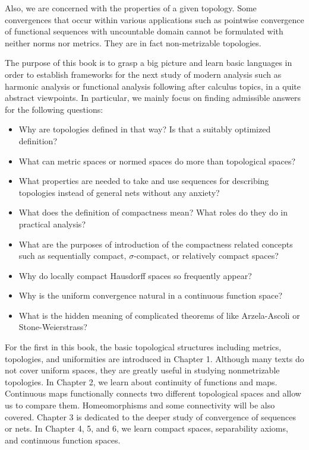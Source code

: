 Also, we are concerned with the properties of a given topology.
Some convergences that occur within various applications such as pointwise convergence of functional sequences with uncountable domain cannot be formulated with neither norms nor metrics.
They are in fact non-metrizable topologies.
\fi




The purpose of this book is to grasp a big picture and learn basic languages in order to establish frameworks for the next study of modern analysis such as harmonic analysis or functional analysis following after calculus topics, in a quite abstract viewpoints.
In particular, we mainly focus on finding admissible answers for the following questions:
\begin{itemize}
\item Why are topologies defined in that way? Is that a suitably optimized definition?
\item What can metric spaces or normed spaces do more than topological spaces?
\item What properties are needed to take and use sequences for describing topologies instead of general nets without any anxiety? 
\item What does the definition of compactness mean? What roles do they do in practical analysis?
\item What are the purposes of introduction of the compactness related concepts such as sequentially compact, $\sigma$-compact, or relatively compact spaces?
\item Why do locally compact Hausdorff spaces so frequently appear?
\item Why is the uniform convergence natural in a continuous function space?
\item What is the hidden meaning of complicated theorems of like Arzela-Ascoli or Stone-Weierstrass?
\end{itemize}
For the first in this book, the basic topological structures including metrics, topologies, and uniformities are introduced in Chapter 1.
Although many texts do not cover uniform spaces, they are greatly useful in studying nonmetrizable topologies.
In Chapter 2, we learn about continuity of functions and maps.
Continuous maps functionally connects two different topological spaces and allow us to compare them.
Homeomorphisms and some connectivity will be also covered.
Chapter 3 is dedicated to the deeper study of convergence of sequences or nets.
In Chapter 4, 5, and 6, we learn compact spaces, separability axioms, and continuous function spaces.

